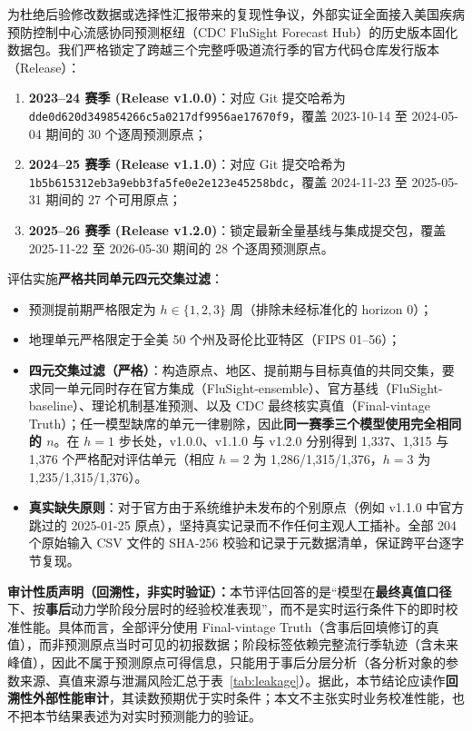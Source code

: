 \documentclass[10pt,a4paper]{article}
\theoremstyle{plain}
\theoremstyle{definition}
\begin{document}
为杜绝后验修改数据或选择性汇报带来的复现性争议，外部实证全面接入美国疾病预防控制中心流感协同预测枢纽（CDC FluSight Forecast Hub）的历史版本固化数据包\citep{flusight2024evaluation}。我们严格锁定了跨越三个完整呼吸道流行季的官方代码仓库发行版本（Release）：
\begin{enumerate}
\item \textbf{2023--24 赛季 (Release v1.0.0)}：对应 Git 提交哈希为 \nolinkurl{dde0d620d349854266c5a0217df9956ae17670f9}，覆盖 2023-10-14 至 2024-05-04 期间的 30 个逐周预测原点；
\item \textbf{2024--25 赛季 (Release v1.1.0)}：对应 Git 提交哈希为 \nolinkurl{1b5b615312eb3a9ebb3fa5fe0e2e123e45258bdc}，覆盖 2024-11-23 至 2025-05-31 期间的 27 个可用原点；
\item \textbf{2025--26 赛季 (Release v1.2.0)}：锁定最新全量基线与集成提交包，覆盖 2025-11-22 至 2026-05-30 期间的 28 个逐周预测原点。
\end{enumerate}

评估实施\textbf{严格共同单元四元交集过滤}：
\begin{itemize}
\item 预测提前期严格限定为 $h \in \{1, 2, 3\}$ 周（排除未经标准化的 horizon 0）；
\item 地理单元严格限定于全美 50 个州及哥伦比亚特区（FIPS 01--56）；
\item \textbf{四元交集过滤（严格）}：构造原点、地区、提前期与目标真值的共同交集，要求同一单元同时存在官方集成（FluSight-ensemble）、官方基线（FluSight-baseline）、理论机制基准预测、以及 CDC 最终核实真值（Final-vintage Truth）；任一模型缺席的单元一律剔除，因此\textbf{同一赛季三个模型使用完全相同的 $n$}。在 $h=1$ 步长处，v1.0.0、v1.1.0 与 v1.2.0 分别得到 1,337、1,315 与 1,376 个严格配对评估单元（相应 $h=2$ 为 1,286/1,315/1,376，$h=3$ 为 1,235/1,315/1,376）。
\item \textbf{真实缺失原则}：对于官方由于系统维护未发布的个别原点（例如 v1.1.0 中官方跳过的 2025-01-25 原点），坚持真实记录而不作任何主观人工插补。全部 204 个原始输入 CSV 文件的 SHA-256 校验和记录于元数据清单，保证跨平台逐字节复现。
\end{itemize}

\noindent\textbf{审计性质声明（回溯性，非实时验证）：}本节评估回答的是“模型在\textbf{最终真值口径}下、按\textbf{事后}动力学阶段分层时的经验校准表现”，而不是实时运行条件下的即时校准性能。具体而言，全部评分使用 Final-vintage Truth（含事后回填修订的真值），而非预测原点当时可见的初报数据；阶段标签依赖完整流行季轨迹（含未来峰值），因此不属于预测原点可得信息，只能用于事后分层分析（各分析对象的参数来源、真值来源与泄漏风险汇总于表~\ref{tab:leakage}）。据此，本节结论应读作\textbf{回溯性外部性能审计}，其读数预期优于实时条件；本文不主张实时业务校准性能，也不把本节结果表述为对实时预测能力的验证。
\end{document}
